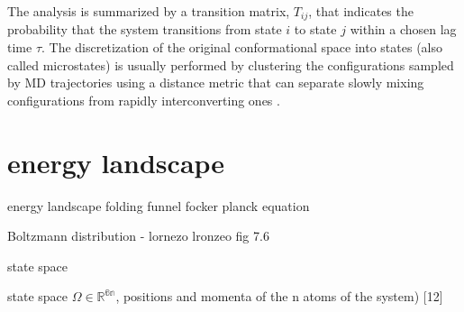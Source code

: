 The analysis is summarized by a transition matrix,
$T_{ij}$, that indicates the probability that the system transitions from state
$i$ to state $j$ within a chosen lag time $\tau$. The discretization of the
original conformational space into states (also called microstates) is usually
performed by clustering the configurations sampled by MD trajectories using
a distance metric that can separate slowly mixing configurations from rapidly
interconverting ones \cite{noe2016commute, Noe2015}.


\section{energy landscape }
energy landscape 
folding funnel
focker planck equation

Boltzmann distribution - lornezo
lronzeo fig 7.6

state space

state space $\varOmega\in\mathbb{R^{6n}}$, positions and momenta of the n atoms of the system)
[12]